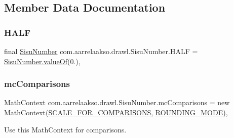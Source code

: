 \subsection{Member Data Documentation}
\mbox{\label{classcom_1_1aarrelaakso_1_1drawl_1_1_sisu_number_afae3e6d652b8c125dccab3e110d038b0}} 
\subsubsection{\texorpdfstring{H\+A\+LF}{HALF}}
{\footnotesize\ttfamily final \hyperlink{classcom_1_1aarrelaakso_1_1drawl_1_1_sisu_number}{Sisu\+Number} com.\+aarrelaakso.\+drawl.\+Sisu\+Number.\+H\+A\+LF = \hyperlink{classcom_1_1aarrelaakso_1_1drawl_1_1_sisu_number_aa78b92a5f2ed2f598c6ba0775cbc2587}{Sisu\+Number.\+value\+Of}(0.)\hspace{0.3cm}{\ttfamily [static]}, {\ttfamily [protected]}}

\mbox{\label{classcom_1_1aarrelaakso_1_1drawl_1_1_sisu_number_a09a6e4440f1be870727ad0bc028fc237}} 
\subsubsection{\texorpdfstring{mc\+Comparisons}{mcComparisons}}
{\footnotesize\ttfamily Math\+Context com.\+aarrelaakso.\+drawl.\+Sisu\+Number.\+mc\+Comparisons = new Math\+Context(\hyperlink{classcom_1_1aarrelaakso_1_1drawl_1_1_sisu_number_a9355f25a360283c24625dbdf2a397a0c}{S\+C\+A\+L\+E\+\_\+\+F\+O\+R\+\_\+\+C\+O\+M\+P\+A\+R\+I\+S\+O\+NS}, \hyperlink{classcom_1_1aarrelaakso_1_1drawl_1_1_sisu_number_a98077c422e928740febf571e3f2ec6b5}{R\+O\+U\+N\+D\+I\+N\+G\+\_\+\+M\+O\+DE})\hspace{0.3cm}{\ttfamily [static]}, {\ttfamily [protected]}}



Use this Math\+Context for comparisons. 

